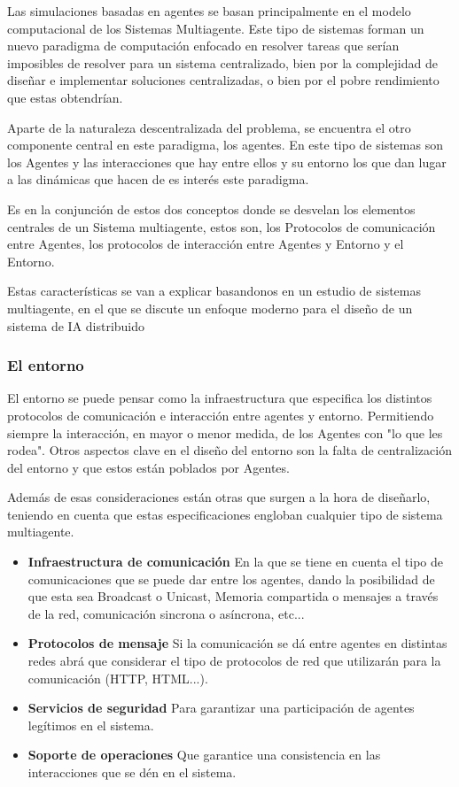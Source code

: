 Las simulaciones basadas en agentes se basan principalmente en el modelo computacional de los Sistemas Multiagente. Este tipo de sistemas forman un nuevo paradigma de computación enfocado en resolver tareas que serían imposibles de resolver para un sistema centralizado, bien por la complejidad de diseñar e implementar soluciones centralizadas, o bien por el pobre rendimiento que estas obtendrían.

Aparte de la naturaleza descentralizada del problema, se encuentra el otro componente central en este paradigma, los agentes. En este tipo de sistemas son los Agentes y las interacciones que hay entre ellos y su entorno los que dan lugar a las dinámicas que hacen de es interés este paradigma.

Es en la conjunción de estos dos conceptos donde se desvelan los elementos centrales de un Sistema multiagente, estos son, los Protocolos de comunicación entre Agentes, los protocolos de interacción entre Agentes y Entorno y el Entorno.

Estas características se van a explicar basandonos en un estudio de sistemas multiagente, en el que se discute un enfoque moderno para el diseño de un sistema de IA distribuido \citep{weiss1999multiagent}

\subsubsection{El entorno}

El entorno se puede pensar como la infraestructura que especifica los distintos protocolos de comunicación e interacción entre agentes y entorno. Permitiendo siempre la interacción, en mayor o menor medida, de los Agentes con "lo que les rodea". Otros aspectos clave en el diseño del entorno son la falta de centralización del entorno y que estos están poblados por Agentes. 

Además de esas consideraciones están otras que surgen a la hora de diseñarlo, teniendo en cuenta que estas especificaciones engloban cualquier tipo de sistema multiagente.

\begin{itemize}
	\item\textbf{Infraestructura de comunicación} En la que se tiene en cuenta el tipo de comunicaciones que se puede dar entre los agentes, dando la posibilidad de que esta sea Broadcast o Unicast, Memoria compartida o mensajes a través de la red, comunicación sincrona o asíncrona, etc...
	\item\textbf{Protocolos de mensaje} Si la comunicación se dá entre agentes en distintas redes abrá que considerar el tipo de protocolos de red que utilizarán para la comunicación (HTTP, HTML...).
	\item\textbf{Servicios de seguridad} Para garantizar una participación de agentes legítimos en el sistema.
	\item\textbf{Soporte de operaciones} Que garantice una consistencia en las interacciones que se dén en el sistema.
\end{itemize}

